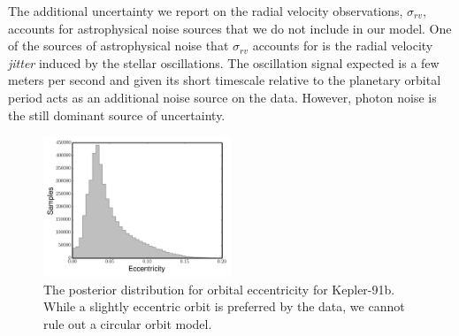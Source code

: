 \documentclass[apjl]{emulateapj}
\begin{document}
The additional uncertainty we report on the radial velocity observations, $\sigma_{rv}$, accounts for astrophysical noise sources that we do not include in our model. One of the sources of astrophysical noise that $\sigma_{rv}$ accounts for is the radial velocity \emph{jitter} induced by the stellar oscillations. The oscillation signal expected is a few meters per second \citep{kjeldsen95} and given its short timescale relative to the planetary orbital period  acts as an additional noise source on the data. However, photon noise is the still dominant source of uncertainty.


\begin{figure}
\includegraphics[width=0.50\textwidth]{ecc_hist.pdf}
\caption{The posterior distribution for orbital eccentricity for Kepler-91b. While a slightly eccentric orbit is preferred by the data, we cannot rule out a circular orbit model.}
\label{fig:ecc}
\end{figure}
\end{document}
